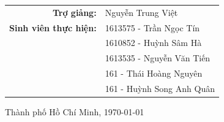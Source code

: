 \begin{titlepage}
\begin{center}
\begin{table}[h!]
\begin{tabular}{ll}
		\multicolumn{1}{r}{\textbf{ Trợ giảng: }} 
		& Nguyễn Trung Việt \\
		
		\multicolumn{1}{r}{\textbf{Sinh viên thực hiện:}} 
		& 1613575 - Trần Ngọc Tín    \\
		& 1610852 - Huỳnh Sâm Hà     \\
		& 1613535 - Nguyễn Văn Tiến \\
		& 161 - Thái Hoàng Nguyên  \\
		& 161 - Huỳnh Song Anh Quân   
	
	\end{tabular}
	
\end{table}


\vspace{2.4cm}  

{\small Thành phố Hồ Chí Minh, \today}

\end{center} 

\end{titlepage}

